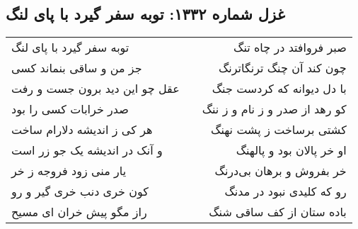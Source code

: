 \begin{center}
\section*{غزل شماره ۱۳۳۲: توبه سفر گیرد با پای لنگ}
\label{sec:1332}
\begin{longtable}{l p{0.5cm} r}
توبه سفر گیرد با پای لنگ
&&
صبر فروافتد در چاه تنگ
\\
جز من و ساقی بنماند کسی
&&
چون کند آن چنگ ترنگاترنگ
\\
عقل چو این دید برون جست و رفت
&&
با دل دیوانه که کردست جنگ
\\
صدر خرابات کسی را بود
&&
کو رهد از صدر و ز نام و ز ننگ
\\
هر کی ز اندیشه دلارام ساخت
&&
کشتی برساخت ز پشت نهنگ
\\
و آنک در اندیشه یک جو زر است
&&
او خر پالان بود و پالهنگ
\\
یار منی زود فروجه ز خر
&&
خر بفروش و برهان بی‌درنگ
\\
کون خری دنب خری گیر و رو
&&
رو که کلیدی نبود در مدنگ
\\
راز مگو پیش خران ای مسیح
&&
باده ستان از کف ساقی شنگ
\\
\end{longtable}
\end{center}
